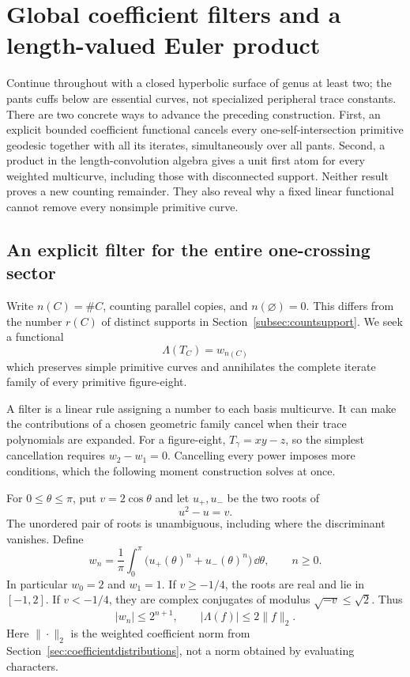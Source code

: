 \section{Global coefficient filters and a length-valued Euler product}
\label{sec:globalfilters}

Continue throughout with a closed hyperbolic surface of genus at least
two; the pants cuffs below are essential curves, not specialized
peripheral trace constants. There are two concrete ways to advance the
preceding construction.
First, an explicit bounded coefficient functional cancels every
one-self-intersection primitive geodesic together with all its iterates,
simultaneously over all pants. Second, a product in the length-convolution
algebra gives a unit first atom for every weighted multicurve, including
those with disconnected support. Neither result proves a new counting
remainder. They also reveal why a fixed linear functional cannot remove
every nonsimple primitive curve.

\subsection{An explicit filter for the entire one-crossing sector}

Write $n(C)=\#C$, counting parallel copies, and $n(\varnothing)=0$.
This differs from the number $r(C)$ of distinct supports in
Section~\ref{subsec:countsupport}. We seek a functional
\[
 \Lambda(T_C)=w_{n(C)}
\]
which preserves simple primitive curves and annihilates the complete
iterate family of every primitive figure-eight.

A filter is a linear rule assigning a number to each basis
multicurve. It can make the contributions of a chosen geometric
family cancel when their trace polynomials are expanded.
For a figure-eight, $T_\gamma=xy-z$, so the simplest cancellation
requires $w_2-w_1=0$. Cancelling every power imposes more
conditions, which the following moment construction solves at once.

For $0\leq\theta\leq\pi$, put $v=2\cos\theta$ and let
$u_+,u_-$ be the two roots of
\[
 u^2-u=v.
\]
The unordered pair of roots is unambiguous, including where the
discriminant vanishes. Define
\begin{equation}
 w_n=\frac1\pi\int_0^\pi
       \bigl(u_+(\theta)^n+u_-(\theta)^n\bigr)\,\dd\theta,
 \qquad n\geq0.
 \label{eq:globalmoments}
\end{equation}
In particular $w_0=2$ and $w_1=1$. If $v\geq-1/4$, the roots are
real and lie in $[-1,2]$. If $v<-1/4$, they are complex conjugates
of modulus $\sqrt{-v}\leq\sqrt2$. Thus
\begin{equation}
 |w_n|\leq2^{n+1},\qquad
 |\Lambda(f)|\leq2\|f\|_2.
 \label{eq:globalbounded}
\end{equation}
Here $\|\cdot\|_2$ is the weighted coefficient norm from
Section~\ref{sec:coefficientdistributions}, not a norm obtained
by evaluating characters.

